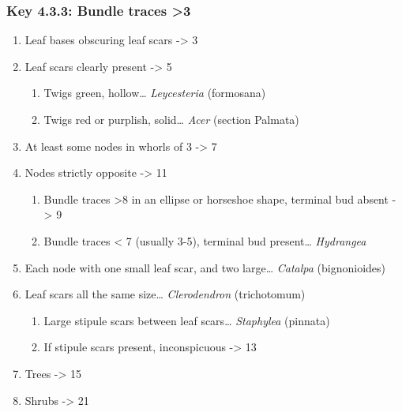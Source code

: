 \documentclass[openany]{book}
\providecommand{\tightlist}{%
  \setlength{\itemsep}{0pt}\setlength{\parskip}{0pt}}
\begin{document}
\hypertarget{key-4.3.3-bundle-traces-3}{%
\subsubsection{Key 4.3.3: Bundle traces
\textgreater{}3}\label{key-4.3.3-bundle-traces-3}}

\begin{enumerate}
\def\labelenumi{\arabic{enumi}.}
\tightlist
\item
  Leaf bases obscuring leaf scars -\textgreater{} 3
\item
  Leaf scars clearly present -\textgreater{} 5

  \begin{enumerate}
  \def\labelenumii{\arabic{enumii}.}
  \setcounter{enumii}{2}
  \tightlist
  \item
    Twigs green, hollow\ldots{} \emph{Leycesteria} (formosana)
  \item
    Twigs red or purplish, solid\ldots{} \emph{Acer} (section Palmata)
  \end{enumerate}
\item
  At least some nodes in whorls of 3 -\textgreater{} 7
\item
  Nodes strictly opposite -\textgreater{} 11

  \begin{enumerate}
  \def\labelenumii{\arabic{enumii}.}
  \setcounter{enumii}{6}
  \tightlist
  \item
    Bundle traces \textgreater{}8 in an ellipse or horseshoe shape,
    terminal bud absent -\textgreater{} 9
  \item
    Bundle traces \textless{} 7 (usually 3-5), terminal bud
    present\ldots{} \emph{Hydrangea}
  \end{enumerate}
\item
  Each node with one small leaf scar, and two large\ldots{}
  \emph{Catalpa} (bignonioides)
\item
  Leaf scars all the same size\ldots{} \emph{Clerodendron} (trichotomum)

  \begin{enumerate}
  \def\labelenumii{\arabic{enumii}.}
  \setcounter{enumii}{10}
  \tightlist
  \item
    Large stipule scars between leaf scars\ldots{} \emph{Staphylea}
    (pinnata)
  \item
    If stipule scars present, inconspicuous -\textgreater{} 13
  \end{enumerate}
\item
  Trees -\textgreater{} 15
\item
  Shrubs -\textgreater{} 21


\end{enumerate}
\end{document}

